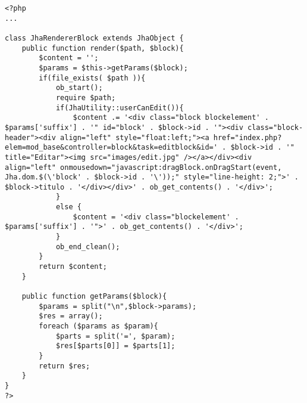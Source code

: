 \begin{lstlisting}[label=jha_renderer_block,caption=Renderizador de bloques.]
<?php
...

class JhaRendererBlock extends JhaObject {
	public function render($path, $block){
		$content = '';
		$params = $this->getParams($block);
	    if(file_exists( $path )){
            ob_start();
            require $path;
            if(JhaUtility::userCanEdit()){
                $content .= '<div class="block blockelement' . $params['suffix'] . '" id="block' . $block->id . '"><div class="block-header"><div align="left" style="float:left;"><a href="index.php?elem=mod_base&controller=block&task=editblock&id=' . $block->id . '" title="Editar"><img src="images/edit.jpg" /></a></div><div align="left" onmousedown="javascript:dragBlock.onDragStart(event, Jha.dom.$(\'block' . $block->id . '\'));" style="line-height: 2;">' . $block->titulo . '</div></div>' . ob_get_contents() . '</div>';
            }
            else {
                $content = '<div class="blockelement' . $params['suffix'] . '">' . ob_get_contents() . '</div>';
            }
            ob_end_clean();
        }
        return $content;
	}
	
	public function getParams($block){
		$params = split("\n",$block->params);
		$res = array();
		foreach ($params as $param){
			$parts = split('=', $param);
			$res[$parts[0]] = $parts[1];
		}
		return $res;
	}
}
?>
\end{lstlisting}
